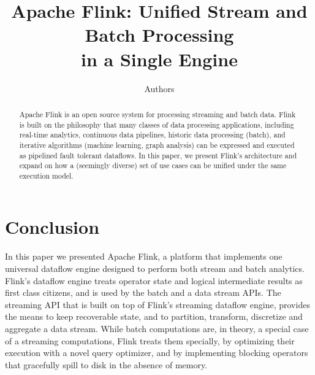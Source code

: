 \documentclass[11pt]{article}
\begin{document}
\title{Apache Flink\texttrademark: Unified Stream and Batch Processing \\ in a Single Engine}

\author{Authors}

\maketitle

\begin{abstract}
Apache Flink is an open source system for processing streaming and batch data. Flink is built on the philosophy that many classes of data processing applications, including real-time analytics, continuous data pipelines, historic data processing (batch), and iterative algorithms (machine learning, graph analysis) can be expressed and executed as pipelined fault tolerant dataflows. In this paper, we present Flink’s architecture and expand on how a (seemingly diverse) set of use cases can be unified under the same execution model.
\end{abstract}








\section{Conclusion}
\label{sec:conclusions}
In this paper we presented Apache Flink, a platform that implements one universal dataflow engine designed to perform both stream and batch analytics. Flink's dataflow engine treats operator state and logical intermediate results as first class citizens, and is used by the batch and a data stream APIs. The streaming API that is built on top of  Flink's streaming dataflow engine, provides the means to keep recoverable state, and to partition, transform, discretize and aggregate a data stream. While batch computations are, in theory, a special case of a streaming computations, Flink treats them specially, by optimizing their execution with a novel query optimizer, and by implementing blocking operators that gracefully spill to disk in the absence of memory. 
{
\small


}
\end{document}
